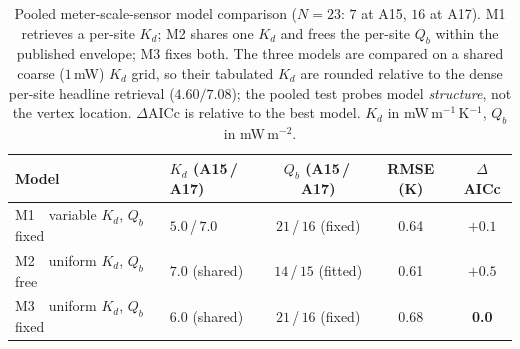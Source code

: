\documentclass[11pt]{article}
\begin{document}
\begin{table}[!htbp]
\centering
\small
\caption{Pooled meter-scale-sensor model comparison
($N=23$: $7$ at A15, $16$ at A17). M1 retrieves a per-site $K_d$; M2 shares
one $K_d$ and frees the per-site $Q_b$ within the published envelope; M3
fixes both. The three models are compared on a shared coarse
($1$\,mW) $K_d$ grid, so their tabulated $K_d$ are rounded relative to
the dense per-site headline retrieval ($4.60/7.08$); the pooled test
probes model \emph{structure}, not the vertex location. $\Delta$AICc
is relative to the best model. $K_d$ in
mW\,m$^{-1}$\,K$^{-1}$, $Q_b$ in mW\,m$^{-2}$.}
\label{tab:modelcomp}
\begin{tabular}{llccc}
\toprule
Model & $K_d$ (A15\,/\,A17) & $Q_b$ (A15\,/\,A17) & RMSE (K) & $\Delta$AICc \\
\midrule
M1\ \ variable $K_d$, $Q_b$ fixed & $5.0$\,/\,$7.0$ & $21$\,/\,$16$ (fixed) & 0.64 & $+0.1$ \\
M2\ \ uniform $K_d$, $Q_b$ free   & $7.0$ (shared)   & $14$\,/\,$15$ (fitted) & 0.61 & $+0.5$ \\
M3\ \ uniform $K_d$, $Q_b$ fixed  & $6.0$ (shared)  & $21$\,/\,$16$ (fixed) & 0.68 & \textbf{0.0} \\
\bottomrule
\end{tabular}
\end{table}
\end{document}
